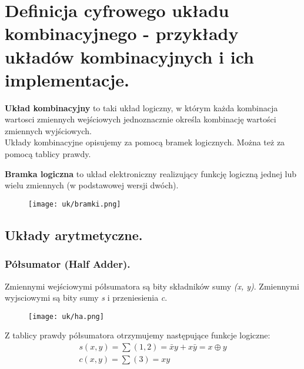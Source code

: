 \documentclass[main.tex]{subfiles}
\begin{document}
    \newpage

    \section{Definicja cyfrowego układu kombinacyjnego - przykłady układów kombinacyjnych i ich implementacje.}

    \begin{definition}
        \textbf{Układ kombinacyjny} to taki układ logiczny, w którym każda kombinacja wartosci zmiennych wejściowych
        jednoznacznie określa kombinację wartości zmiennych wyjściowych.\\

        Układy kombinacyjne opisujemy za pomocą bramek logicznych. Można też za pomocą tablicy prawdy.
    \end{definition}

    \begin{definition}
        \textbf{Bramka logiczna} to układ elektroniczny realizujący funkcję logiczną jednej lub wielu zmiennych
        (w podstawowej wersji dwóch).
    \end{definition}

    \begin{figure}[H]
        \texttt{[image: uk/bramki.png]}
    \end{figure}

    \subsection{Układy arytmetyczne.}

    \subsubsection{Półsumator (Half Adder).}
    Zmiennymi wejściowymi półsumatora są bity składników sumy \textit{(x, y)}. Zmiennymi wyjsciowymi są bity
    sumy \textit{s} i przeniesienia \textit{c}.

    \begin{figure}[H]
        \texttt{[image: uk/ha.png]}
    \end{figure}

    Z tablicy prawdy półsumatora otrzymujemy następujące funkcje logiczne:
    \begin{gather*}
        s(x,y) = \sum (1,2) = \bar{x}y + x\bar{y} = x \oplus y\\
        c(x,y) = \sum (3) = xy\\
    \end{gather*}
\end{document}

